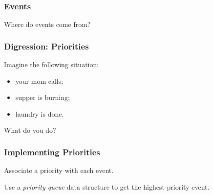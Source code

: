 \begin{frame}
\frametitle{Events}

\Large

\begin{changemargin}{1cm}
Where do events come from?
\end{changemargin}

\end{frame}

\begin{frame}
\frametitle{Digression: Priorities}

\begin{changemargin}{1cm}
Imagine the following situation:
\begin{itemize}
\item your mom calls;
\item supper is burning;
\item laundry is done.
\end{itemize}

What do you do?
\end{changemargin}

\end{frame}

\begin{frame}
\frametitle{Implementing Priorities}

\begin{changemargin}{1cm}
Associate a priority with each event.

Use a \emph{priority queue} data structure to get the highest-priority event.
\end{changemargin}

\begin{center}

\end{center}
\end{frame}

